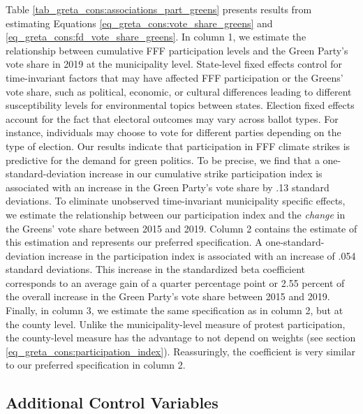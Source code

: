 


Table \ref{tab_greta_cons:associations_part_greens} presents results from estimating Equations \ref{eq_greta_cons:vote_share_greens} and \ref{eq_greta_cons:fd_vote_share_greens}. In column 1, we estimate the relationship between cumulative FFF participation levels and the Green Party's vote share in 2019 at the municipality level. State-level fixed effects control for time-invariant factors that may have affected FFF participation or the Greens' vote share, such as political, economic, or cultural differences leading to different susceptibility levels for environmental topics between states. Election fixed effects account for the fact that electoral outcomes may vary across ballot types. For instance, individuals may choose to vote for different parties depending on the type of election. Our results indicate that participation in FFF climate strikes is predictive for the demand for green politics. To be precise, we find that a one-standard-deviation increase in our cumulative strike participation index is associated with an increase in the Green Party's vote share by .13 standard deviations. To eliminate unobserved time-invariant municipality specific effects, we estimate the relationship between our participation index and the \emph{change} in the Greens' vote share between 2015 and 2019. Column 2 contains the estimate of this estimation and represents our preferred specification. A one-standard-deviation increase in the participation index is associated with an increase of .054 standard deviations. This increase in the standardized beta coefficient corresponds to an average gain of a quarter percentage point or 2.55 percent of the overall increase in the Green Party's vote share between 2015 and 2019. Finally, in column 3, we estimate the same specification as in column 2, but at the county level. Unlike the municipality-level measure of protest participation, the county-level measure has the advantage to not depend on weights (see section \ref*{eq_greta_cons:participation_index}). Reassuringly, the coefficient is very similar to our preferred specification in column 2.





\subsection{Additional Control Variables}

